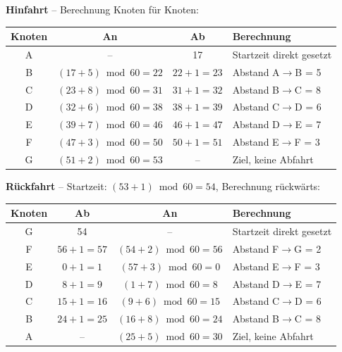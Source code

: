 \documentclass[12pt,a4paper]{article}
\begin{document}
\begin{beispielbox}[title={Einfache Fahrt -- Beispiel2: A--B--C--D--E--F--G, Abstände: 5 8 6 7 3 2, Start: 17}]

\textbf{Hinfahrt} -- Berechnung Knoten für Knoten:

\begin{center}
\begin{tabular}{c|c|c|p{7cm}}
\toprule
\textbf{Knoten} & \textbf{An} & \textbf{Ab} & \textbf{Berechnung} \\
\midrule
A & -- & 17 & Startzeit direkt gesetzt \\
B & $(17+5)\bmod60 = 22$ & $22+1 = 23$ & Abstand A$\to$B = 5 \\
C & $(23+8)\bmod60 = 31$ & $31+1 = 32$ & Abstand B$\to$C = 8 \\
D & $(32+6)\bmod60 = 38$ & $38+1 = 39$ & Abstand C$\to$D = 6 \\
E & $(39+7)\bmod60 = 46$ & $46+1 = 47$ & Abstand D$\to$E = 7 \\
F & $(47+3)\bmod60 = 50$ & $50+1 = 51$ & Abstand E$\to$F = 3 \\
G & $(51+2)\bmod60 = 53$ & -- & Ziel, keine Abfahrt \\
\bottomrule
\end{tabular}
\end{center}

\textbf{Rückfahrt} -- Startzeit: $(53+1)\bmod60 = 54$, Berechnung rückwärts:

\begin{center}
\begin{tabular}{c|c|c|p{7cm}}
\toprule
\textbf{Knoten} & \textbf{Ab} & \textbf{An} & \textbf{Berechnung} \\
\midrule
G & 54 & -- & Startzeit direkt gesetzt \\
F & $56+1 = 57$ & $(54+2)\bmod60 = 56$ & Abstand F$\to$G = 2 \\
E & $0+1 = 1$ & $(57+3)\bmod60 = 0$ & Abstand E$\to$F = 3 \\
D & $8+1 = 9$ & $(1+7)\bmod60 = 8$ & Abstand D$\to$E = 7 \\
C & $15+1 = 16$ & $(9+6)\bmod60 = 15$ & Abstand C$\to$D = 6 \\
B & $24+1 = 25$ & $(16+8)\bmod60 = 24$ & Abstand B$\to$C = 8 \\
A & -- & $(25+5)\bmod60 = 30$ & Ziel, keine Abfahrt \\
\bottomrule
\end{tabular}
\end{center}


\end{beispielbox}
\end{document}
